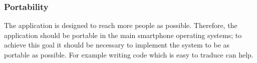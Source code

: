 \subsubsection{Portability}
The application is designed to reach more people as possible. Therefore, the application should be portable in the main smartphone operating systems; to achieve this goal it should be necessary to implement the system to be as portable as possible. For example writing code which is easy to traduce can help.

